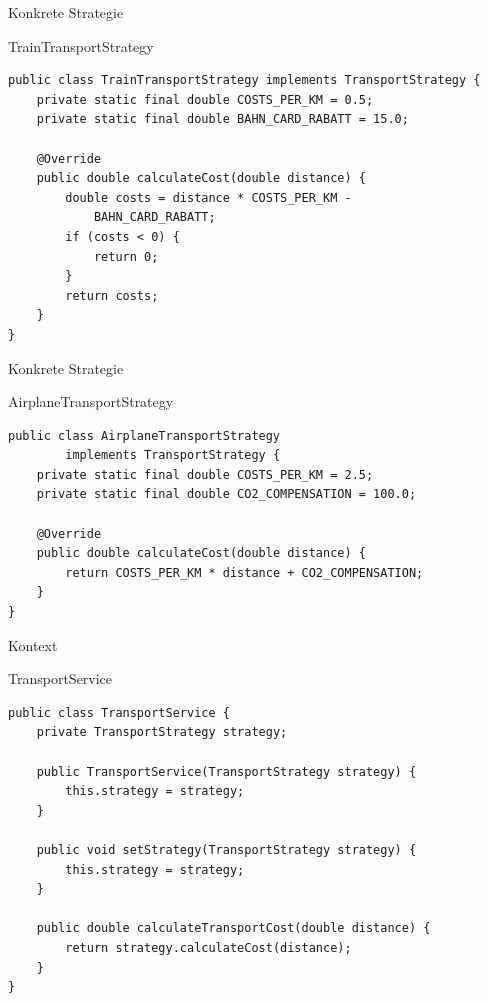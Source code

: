 \begin{frame}[fragile]{Konkrete Strategie}
	\begin{exampleblock}{TrainTransportStrategy}
 		\begin{lstlisting}
public class TrainTransportStrategy implements TransportStrategy {
	private static final double COSTS_PER_KM = 0.5;
	private static final double BAHN_CARD_RABATT = 15.0;
	
    @Override
    public double calculateCost(double distance) {
    	double costs = distance * COSTS_PER_KM - 
            BAHN_CARD_RABATT;
    	if (costs < 0) {
    		return 0;
    	}
        return costs;
    }
}
 		\end{lstlisting}
 	\end{exampleblock}
\end{frame}

\begin{frame}[fragile]{Konkrete Strategie}
	\begin{exampleblock}{AirplaneTransportStrategy}
 		\begin{lstlisting}
public class AirplaneTransportStrategy 
        implements TransportStrategy {
	private static final double COSTS_PER_KM = 2.5;
	private static final double CO2_COMPENSATION = 100.0;
	
    @Override
    public double calculateCost(double distance) {
        return COSTS_PER_KM * distance + CO2_COMPENSATION;
    }
}
 		\end{lstlisting}
 	\end{exampleblock}
\end{frame}

\begin{frame}[fragile]{Kontext}
	\begin{exampleblock}{TransportService}
 		\begin{lstlisting}
public class TransportService {
	private TransportStrategy strategy;

	public TransportService(TransportStrategy strategy) {
		this.strategy = strategy;
	}

	public void setStrategy(TransportStrategy strategy) {
		this.strategy = strategy;
	}

	public double calculateTransportCost(double distance) {
		return strategy.calculateCost(distance);
	}
}

 		\end{lstlisting}
 	\end{exampleblock}
\end{frame}


